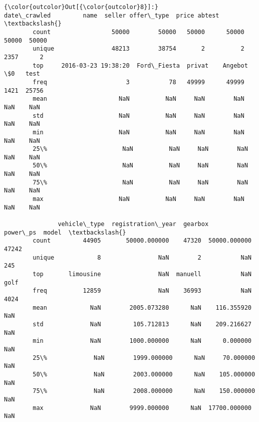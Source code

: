 \documentclass[11pt]{article}
\begin{document}
\begin{Verbatim}[commandchars=\\\{\}]
{\color{outcolor}Out[{\color{outcolor}8}]:}                date\_crawled         name  seller offer\_type  price abtest  \textbackslash{}
        count                 50000        50000   50000      50000  50000  50000   
        unique                48213        38754       2          2   2357      2   
        top     2016-03-23 19:38:20  Ford\_Fiesta  privat    Angebot     \$0   test   
        freq                      3           78   49999      49999   1421  25756   
        mean                    NaN          NaN     NaN        NaN    NaN    NaN   
        std                     NaN          NaN     NaN        NaN    NaN    NaN   
        min                     NaN          NaN     NaN        NaN    NaN    NaN   
        25\%                     NaN          NaN     NaN        NaN    NaN    NaN   
        50\%                     NaN          NaN     NaN        NaN    NaN    NaN   
        75\%                     NaN          NaN     NaN        NaN    NaN    NaN   
        max                     NaN          NaN     NaN        NaN    NaN    NaN   
        
               vehicle\_type  registration\_year  gearbox      power\_ps  model  \textbackslash{}
        count         44905       50000.000000    47320  50000.000000  47242   
        unique            8                NaN        2           NaN    245   
        top       limousine                NaN  manuell           NaN   golf   
        freq          12859                NaN    36993           NaN   4024   
        mean            NaN        2005.073280      NaN    116.355920    NaN   
        std             NaN         105.712813      NaN    209.216627    NaN   
        min             NaN        1000.000000      NaN      0.000000    NaN   
        25\%             NaN        1999.000000      NaN     70.000000    NaN   
        50\%             NaN        2003.000000      NaN    105.000000    NaN   
        75\%             NaN        2008.000000      NaN    150.000000    NaN   
        max             NaN        9999.000000      NaN  17700.000000    NaN   
        

\end{Verbatim}
\end{document}
